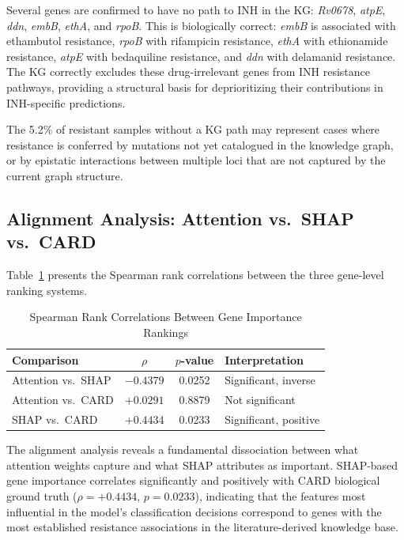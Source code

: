 \documentclass[conference]{IEEEtran}
\begin{document}
Several genes are confirmed to have no path to INH in the KG: \textit{Rv0678}, \textit{atpE}, \textit{ddn}, \textit{embB}, \textit{ethA}, and \textit{rpoB}. This is biologically correct: \textit{embB} is associated with ethambutol resistance, \textit{rpoB} with rifampicin resistance, \textit{ethA} with ethionamide resistance, \textit{atpE} with bedaquiline resistance, and \textit{ddn} with delamanid resistance. The KG correctly excludes these drug-irrelevant genes from INH resistance pathways, providing a structural basis for deprioritizing their contributions in INH-specific predictions.

The 5.2\% of resistant samples without a KG path may represent cases where resistance is conferred by mutations not yet catalogued in the knowledge graph, or by epistatic interactions between multiple loci that are not captured by the current graph structure.

\subsection{Alignment Analysis: Attention vs.\ SHAP vs.\ CARD}

Table~\ref{tab:alignment} presents the Spearman rank correlations between the three gene-level ranking systems.

\begin{table}[t]
\centering
\caption{Spearman Rank Correlations Between Gene Importance Rankings}
\label{tab:alignment}
\begin{tabular}{lccl}
\toprule
\textbf{Comparison} & \textbf{$\rho$} & \textbf{$p$-value} & \textbf{Interpretation} \\
\midrule
Attention vs.\ SHAP & $-0.4379$ & 0.0252 & Significant, inverse \\
Attention vs.\ CARD & $+0.0291$ & 0.8879 & Not significant \\
SHAP vs.\ CARD      & $+0.4434$ & 0.0233 & Significant, positive \\
\bottomrule
\end{tabular}
\end{table}

The alignment analysis reveals a fundamental dissociation between what attention weights capture and what SHAP attributes as important. SHAP-based gene importance correlates significantly and positively with CARD biological ground truth ($\rho = +0.4434$, $p = 0.0233$), indicating that the features most influential in the model's classification decisions correspond to genes with the most established resistance associations in the literature-derived knowledge base.
\end{document}
